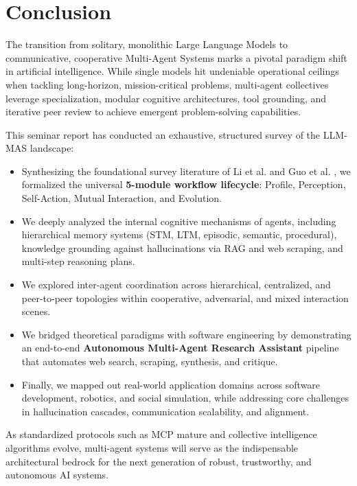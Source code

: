 \documentclass[12pt,a4paper]{report}
\begin{document}
\chapter{Conclusion}
\label{chap:conclusion}

The transition from solitary, monolithic Large Language Models to communicative, cooperative Multi-Agent Systems marks a pivotal paradigm shift in artificial intelligence. While single models hit undeniable operational ceilings when tackling long-horizon, mission-critical problems, multi-agent collectives leverage specialization, modular cognitive architectures, tool grounding, and iterative peer review to achieve emergent problem-solving capabilities.

This seminar report has conducted an exhaustive, structured survey of the LLM-MAS landscape:
\begin{itemize}
    \item Synthesizing the foundational survey literature of Li et al. \cite{li2024survey} and Guo et al. \cite{guo2024large}, we formalized the universal \textbf{5-module workflow lifecycle}: Profile, Perception, Self-Action, Mutual Interaction, and Evolution.
    \item We deeply analyzed the internal cognitive mechanisms of agents, including hierarchical memory systems (STM, LTM, episodic, semantic, procedural), knowledge grounding against hallucinations via RAG and web scraping, and multi-step reasoning plans.
    \item We explored inter-agent coordination across hierarchical, centralized, and peer-to-peer topologies within cooperative, adversarial, and mixed interaction scenes.
    \item We bridged theoretical paradigms with software engineering by demonstrating an end-to-end \textbf{Autonomous Multi-Agent Research Assistant} pipeline that automates web search, scraping, synthesis, and critique.
    \item Finally, we mapped out real-world application domains across software development, robotics, and social simulation, while addressing core challenges in hallucination cascades, communication scalability, and alignment.
\end{itemize}

As standardized protocols such as MCP mature and collective intelligence algorithms evolve, multi-agent systems will serve as the indispensable architectural bedrock for the next generation of robust, trustworthy, and autonomous AI systems.


\newpage
{}


\end{document}

